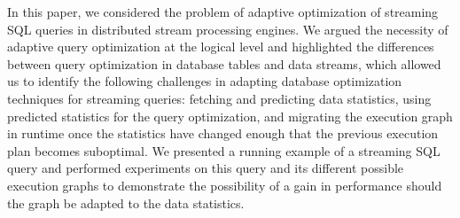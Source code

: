 \label {sec:fs-optimization-conclusion}
In this paper, we considered the problem of adaptive optimization of streaming SQL queries in distributed stream processing engines. We argued the necessity of adaptive query optimization at the logical level and highlighted the differences between query optimization in database tables and data streams, which allowed us to identify the following challenges in adapting database optimization techniques for streaming queries: fetching and predicting data statistics, using predicted statistics for the query optimization, and migrating the execution graph in runtime once the statistics have changed enough that the previous execution plan becomes suboptimal. We presented a running example of a streaming SQL query and performed experiments on this query and its different possible execution graphs to demonstrate the possibility of a gain in performance should the graph be adapted to the data statistics. 